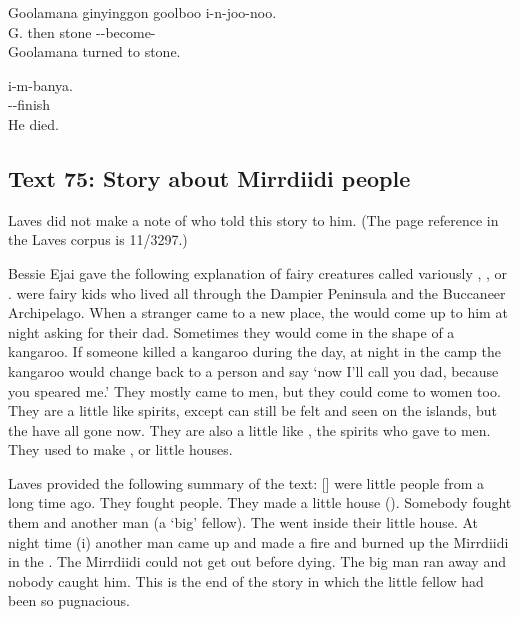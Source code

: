 \begin{exye}
\exy {}
\gll Goolamana ginyinggon goolboo i-n-joo-noo.\\
G.        then       stone   --become-\\
\glt  Goolamana turned to stone.

\exy {}
\gll i-m-banya.\\
--finish\\
\glt  He died.
\end{exye}

\subsection{Text 75: Story about Mirrdiidi people}

Laves did not make a note of who told this story to him. (The page reference in the Laves corpus is 11/3297.)

Bessie Ejai gave the following explanation of fairy creatures called variously ,  , or .   were fairy kids who lived all through the Dampier Peninsula and the Buccaneer Archipelago. When a stranger came to a new place, the  would come up to him
at night asking for their dad. Sometimes they would come in the shape of a kangaroo. If someone killed a  kangaroo during the day, at night in the camp the kangaroo would change back to a  person and say `now I'll call you dad, because you speared me.' They mostly came to men, but
they could come to women too. They are a little like  spirits, except  can still be felt and seen on the
islands, but the  have all gone now. They are also a little like , the spirits who gave  to men. They used to make , or little houses.

Laves provided the following summary of the text: \newline {} [] were little people from a long time ago. They fought people. They made a little house (). Somebody
fought them and another man (a  `big' fellow). The  went inside their little house. At night time (i) another man came
up and made a fire and burned up the Mirrdiidi in the . The Mirrdiidi could not get out before dying. The big man ran away and nobody caught him. This is the end of the story in which the little fellow had been so pugnacious.\setcounter{exxy}{0}

